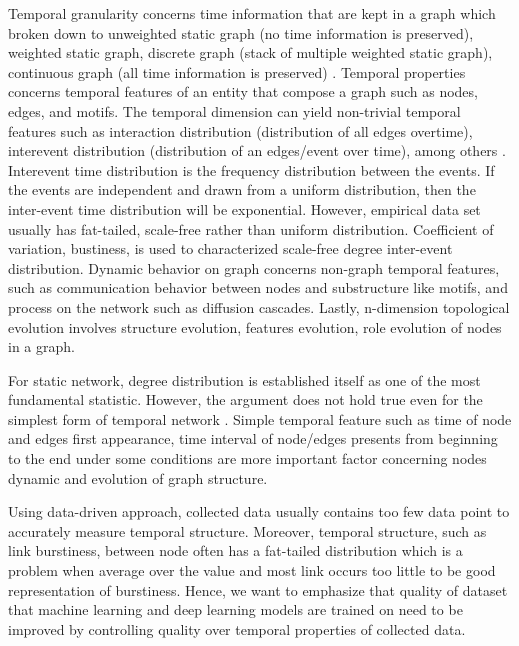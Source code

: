 \documentclass{IEEEtran}
\begin{document}
Temporal granularity concerns time information that are kept in a graph which broken down to unweighted static graph (no time information is preserved), weighted static graph, discrete graph (stack of multiple weighted static graph), continuous graph (all time information is preserved) \cite{skardingFoundationsModelingDynamic2021}. Temporal properties concerns temporal features of an entity that compose a graph such as nodes, edges, and motifs. The temporal dimension can yield non-trivial temporal features such as interaction distribution (distribution of all edges overtime), interevent distribution (distribution of an edges/event over time), among others \cite{holme2012temporal,holme2015modern}. Interevent time distribution is the frequency distribution between the events. If the events are independent and drawn from a uniform distribution, then the inter-event time distribution will be exponential. However, empirical data set usually has fat-tailed, scale-free rather than uniform distribution. Coefficient of variation, bustiness, is used to characterized scale-free degree inter-event distribution. Dynamic behavior on graph concerns non-graph temporal features, such as communication behavior between nodes and substructure like motifs, and process on the network such as diffusion cascades. Lastly, n-dimension topological evolution involves structure evolution, features evolution, role evolution of nodes in a graph.

For static network, degree distribution is established itself as one of the most fundamental statistic. However, the argument does not hold true even for the simplest form of temporal network \cite{holme2015modern}. Simple temporal feature such as time of node and edges first appearance, time interval of node/edges presents from beginning to the end under some conditions are more important factor concerning nodes dynamic and evolution of graph structure.

Using data-driven approach, collected data usually contains too few data point to accurately measure temporal structure. Moreover, temporal structure, such as link burstiness, between node often has a fat-tailed distribution which is a problem when average over the value and most link occurs too little to be good representation of burstiness. Hence, we want to emphasize that quality of dataset that machine learning and deep learning models are trained on need to be improved by controlling quality over temporal properties of collected data. \cite{holme2015modern}
\end{document}
